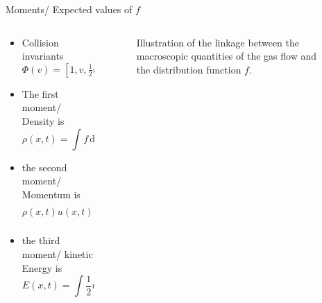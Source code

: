 \documentclass[usenames,dvipsnames,Nike,mathserif]{tuberlinbeamer}
\begin{document}
\begin{frame}[fragile]{Moments/ Expected values of $f$}
	\begin{columns}
		\begin{column}{.5\textwidth}
				\begin{itemize}
				\item Collision invariants $\Phi(v)=[1,v,\frac{1}{2}v^2]$
				\item The first moment/ Density is
				\begin{equation}
					\rho(x,t) = \int\! f \,\mathrm{d}v \,,
				\end{equation}
				\item the second moment/ Momentum is
				\begin{equation}
					\rho(x,t) u(x,t) = \int\! v f \,\mathrm{d}v \,,
				\end{equation}
				\item the third moment/ kinetic Energy is
				\begin{equation}
					E(x,t) = \int\! \frac{1}{2}v^2 f  \,\mathrm{d}v \,.
				\end{equation}
			\end{itemize}
		\end{column}
		\begin{column}{.5\textwidth}
			\begin{center}
				\begin{figure}
					
					\caption{Illustration of the linkage between the macroscopic quantities of the gas flow and the distribution function \(f\).}
				\end{figure}
			\end{center}
		\end{column}
	\end{columns}
\end{frame}
\end{document}
